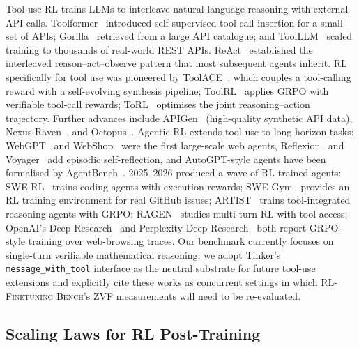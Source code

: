 \documentclass{article}
\newcommand{\ours}{\textsc{RL-Finetuning Bench}}
\begin{document}
Tool-use RL trains LLMs to interleave natural-language reasoning with external
API calls. Toolformer~\cite{schick2023toolformer} introduced self-supervised
tool-call insertion for a small set of APIs; Gorilla~\cite{patil2023gorilla}
retrieved from a large API catalogue; and ToolLLM~\cite{qin2024toolllm} scaled
training to thousands of real-world REST APIs. ReAct~\cite{yao2023react}
established the interleaved reason--act--observe pattern that most subsequent
agents inherit. RL specifically for tool use was pioneered by
ToolACE~\cite{liu2024toolace}, which couples a tool-calling reward with a
self-evolving synthesis pipeline; ToolRL~\cite{qian2025toolrl} applies GRPO
with verifiable tool-call rewards; ToRL~\cite{li2025torl} optimises the joint
reasoning--action trajectory. Further advances include
APIGen~\cite{lin2024apigen} (high-quality synthetic API data),
Nexus-Raven~\cite{nexusflow2024nexusraven}, and
Octopus~\cite{chen2024octopus}. Agentic RL extends tool use to long-horizon
tasks: WebGPT~\cite{nakano2021webgpt} and
WebShop~\cite{yao2022webshop} were the first large-scale web agents,
Reflexion~\cite{shinn2023reflexion} and Voyager~\cite{wang2023voyager} add
episodic self-reflection, and AutoGPT-style agents have been formalised by
AgentBench~\cite{liu2024agentbench}. 2025--2026 produced a wave of RL-trained
agents: SWE-RL~\cite{wei2025swerl} trains coding agents with execution
rewards; SWE-Gym~\cite{pan2025swegym} provides an RL training environment for
real GitHub issues; ARTIST~\cite{singh2025artist} trains tool-integrated
reasoning agents with GRPO; RAGEN~\cite{wang2025ragen} studies multi-turn
RL with tool access; OpenAI's Deep Research~\cite{openai2025deepresearch}
and Perplexity Deep Research~\cite{perplexity2025deepresearch} both report
GRPO-style training over web-browsing traces. Our benchmark currently focuses
on single-turn verifiable mathematical reasoning; we adopt Tinker's
\texttt{message\_with\_tool} interface as the neutral substrate for future
tool-use extensions and explicitly cite these works as concurrent settings in
which \ours{}'s ZVF measurements will need to be re-evaluated.

\subsection{Scaling Laws for RL Post-Training}
\label{sec:related:scaling}
\end{document}
